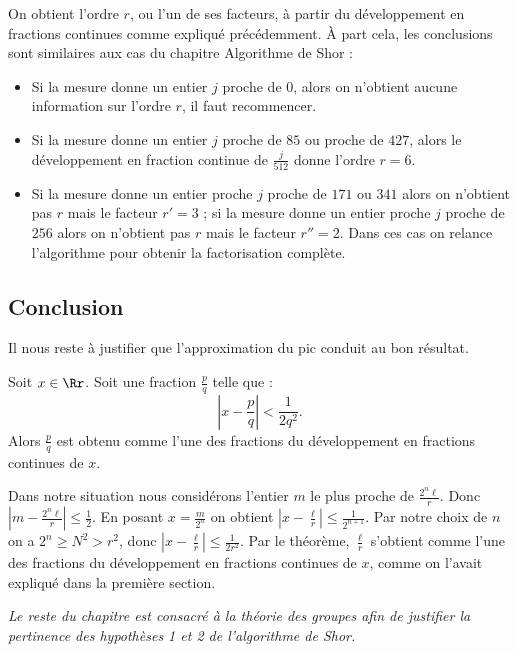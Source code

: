 \documentclass[11pt,class=report,crop=false]{standalone}
\begin{document}
On obtient l'ordre $r$, ou l'un de ses facteurs, à partir du développement en fractions continues comme expliqué précédemment. \`A part cela, les conclusions sont similaires aux cas du chapitre \og{}Algorithme de Shor\fg{} :

\begin{itemize}
  \item Si la mesure donne un entier $j$ proche de $0$, alors on n'obtient aucune information sur l'ordre $r$, il faut recommencer.
  \item Si la mesure donne un entier $j$ proche de $85$ ou proche de $427$, alors le développement en fraction continue de $\frac{j}{512}$ donne l'ordre $r=6$.
  \item Si la mesure donne un entier proche $j$ proche de $171$ ou $341$ alors on n'obtient pas $r$ mais le facteur $r'=3$ ; si la mesure donne un entier proche $j$ proche de $256$ alors on n'obtient pas $r$ mais le facteur $r''=2$. Dans ces cas on relance l'algorithme pour obtenir la factorisation complète.
\end{itemize}


\subsection{Conclusion}

Il nous reste à justifier que l'approximation du pic conduit au bon résultat.

\begin{theoreme}
Soit $x \in \Rr$. Soit une fraction $\frac{p}{q}$ telle que :
$$\left| x - \frac{p}{q} \right| < \frac{1}{2q^2}.$$
Alors $\frac{p}{q}$ est obtenu comme l'une des fractions du développement en fractions continues de $x$.
\end{theoreme}

Dans notre situation nous considérons l'entier $m$ le plus proche de $\frac{2^n\ell}{r}$. Donc $\left|m- \frac{2^n\ell}{r}\right| \le \frac12$.
En posant $x = \frac{m}{2^n}$ on obtient $\left|x- \frac{\ell}{r}\right| \le \frac1{2^{n+1}}$.
Par notre choix de $n$ on a $2^n \ge N^2 > r^2$, donc $\left|x- \frac{\ell}{r}\right| \le \frac1{2r^2}$. Par le théorème, $\frac{\ell}{r}$ s'obtient comme l'une des fractions du développement en fractions continues de $x$, comme on l'avait expliqué dans la première section.

\bigskip

\emph{Le reste du chapitre est consacré à la théorie des groupes afin de justifier la pertinence des hypothèses 1 et 2 de l'algorithme de Shor.}
\end{document}
